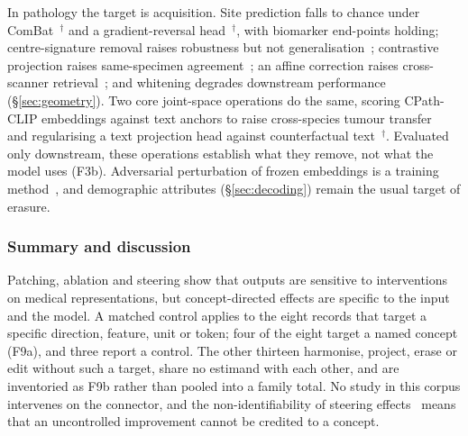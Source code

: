 In pathology the target is acquisition. Site prediction falls to chance under
ComBat~\cite{murchan2024deep}$^{\dagger}$ and a gradient-reversal head~\cite{zhang2025hospital}$^{\dagger}$,
with biomarker end-points holding; centre-signature removal raises robustness but not
generalisation~\cite{kmen2026robust}; contrastive projection raises same-specimen
agreement~\cite{carloni2025pathology}; an affine correction raises cross-scanner
retrieval~\cite{donle2026featmap}; and whitening degrades downstream
performance~\cite{garciahidalgo2026embedding} (\S\ref{sec:geometry}). Two core joint-space operations do
the same, scoring CPath-CLIP embeddings against text anchors to raise cross-species tumour
transfer~\cite{arora2026semantic} and regularising a text projection head against counterfactual
text~\cite{balogh2026regularization}$^{\dagger}$. Evaluated only downstream, these operations establish
what they remove, not what the model uses (F3b). Adversarial perturbation of frozen embeddings is a
training method~\cite{xu2024apple}, and demographic attributes (\S\ref{sec:decoding}) remain the usual
target of erasure.

\subsubsection{Summary and discussion}

Patching, ablation and steering show that outputs are sensitive to interventions on medical
representations, but concept-directed effects are specific to the input and the model. A matched
control applies to the eight records that target a specific direction, feature, unit or token; four of
the eight target a named concept (F9a), and three report a control. The other thirteen harmonise,
project, erase or edit without such a target, share no estimand with each other, and are inventoried as
F9b rather than pooled into a family total. No study in this corpus intervenes on the connector, and
the non-identifiability of steering effects~\cite{korznikov2025the,venkatesh2026nonident} means that an
uncontrolled improvement cannot be credited to a concept.
